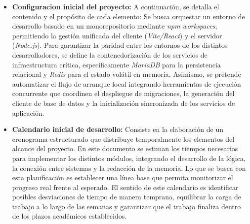 \begin{itemize}
    \item \textbf{Configuracion inicial del proyecto:} 
    A continuación, se detalla el contenido y el propósito de cada elemento: Se busca orquestar un entorno de desarrollo basado en un monorepositorio mediante \textit{npm workspaces}, permitiendo la gestión unificada del cliente (\textit{Vite/React}) y el servidor (\textit{Node.js}). Para garantizar la paridad entre los entornos de los distintos desarrolladores, se define la contenedorización de los servicios de infraestructura crítica, específicamente \textit{MariaDB} para la persistencia relacional y \textit{Redis} para el estado volátil en memoria. Asimismo, se pretende automatizar el flujo de arranque local integrando herramientas de ejecución concurrente que coordinen el despliegue de migraciones, la generación del cliente de base de datos y la inicialización sincronizada de los servicios de aplicación.

    \item \textbf{Calendario inicial de desarrollo:} Consiste en la elaboración de un cronograma estructurado que distribuye temporalmente los elementos del alcance del proyecto. En este documento se estiman los tiempos necesarios para implementar los distintos módulos, integrando el desarrollo de la lógica, la conexión entre sistemas y la redacción de la memoria. Lo que se busca con esta planificación es establecer una línea base que permita monitorizar el progreso real frente al esperado. El sentido de este calendario es identificar posibles desviaciones de tiempo de manera temprana, equilibrar la carga de trabajo a lo largo de las semanas y garantizar que el trabajo finaliza dentro de los plazos académicos establecidos.


\end{itemize}
